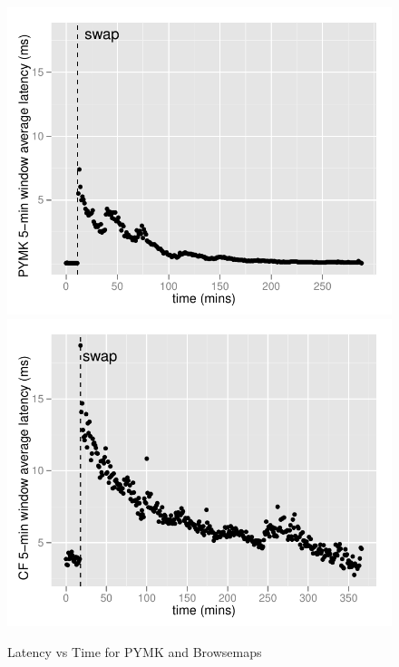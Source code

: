 \begin{figure}
  \centering
    \includegraphics[scale=0.55]{images/pymk_search.pdf}
    \includegraphics[scale=0.55]{images/browsemap_search.pdf}
  \caption{Latency vs Time for PYMK and Browsemaps}
  \label{production}
\end{figure}

